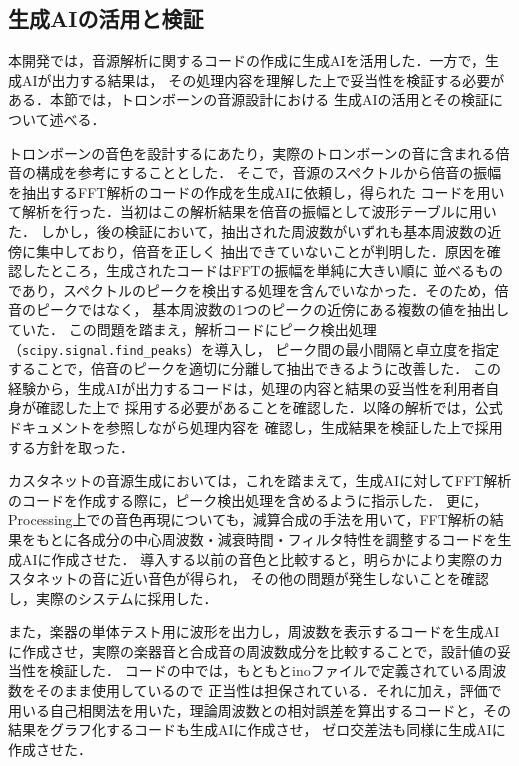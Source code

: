 \subsection{生成AIの活用と検証}
本開発では，音源解析に関するコードの作成に生成AIを活用した．一方で，生成AIが出力する結果は，
その処理内容を理解した上で妥当性を検証する必要がある．本節では，トロンボーンの音源設計における
生成AIの活用とその検証について述べる．

トロンボーンの音色を設計するにあたり，実際のトロンボーンの音に含まれる倍音の構成を参考にすることとした．
そこで，音源のスペクトルから倍音の振幅を抽出するFFT解析のコードの作成を生成AIに依頼し，得られた
コードを用いて解析を行った．当初はこの解析結果を倍音の振幅として波形テーブルに用いた．
しかし，後の検証において，抽出された周波数がいずれも基本周波数の近傍に集中しており，倍音を正しく
抽出できていないことが判明した．原因を確認したところ，生成されたコードはFFTの振幅を単純に大きい順に
並べるものであり，スペクトルのピークを検出する処理を含んでいなかった．そのため，倍音のピークではなく，
基本周波数の1つのピークの近傍にある複数の値を抽出していた．
この問題を踏まえ，解析コードにピーク検出処理（\texttt{scipy.signal.find\_peaks}）を導入し，
ピーク間の最小間隔と卓立度を指定することで，倍音のピークを適切に分離して抽出できるように改善した．
この経験から，生成AIが出力するコードは，処理の内容と結果の妥当性を利用者自身が確認した上で
採用する必要があることを確認した．以降の解析では，公式ドキュメントを参照しながら処理内容を
確認し，生成結果を検証した上で採用する方針を取った．

カスタネットの音源生成においては，これを踏まえて，生成AIに対してFFT解析のコードを作成する際に，ピーク検出処理を含めるように指示した．
更に，Processing上での音色再現についても，減算合成の手法を用いて，FFT解析の結果をもとに各成分の中心周波数・減衰時間・フィルタ特性を調整するコードを生成AIに作成させた．
導入する以前の音色と比較すると，明らかにより実際のカスタネットの音に近い音色が得られ，
その他の問題が発生しないことを確認し，実際のシステムに採用した．

また，楽器の単体テスト用に波形を出力し，周波数を表示するコードを生成AIに作成させ，実際の楽器音と合成音の周波数成分を比較することで，設計値の妥当性を検証した．
コードの中では，もともとinoファイルで定義されている周波数をそのまま使用しているので
正当性は担保されている．それに加え，評価で用いる自己相関法を用いた，理論周波数との相対誤差を算出するコードと，その結果をグラフ化するコードも生成AIに作成させ，
ゼロ交差法も同様に生成AIに作成させた．
